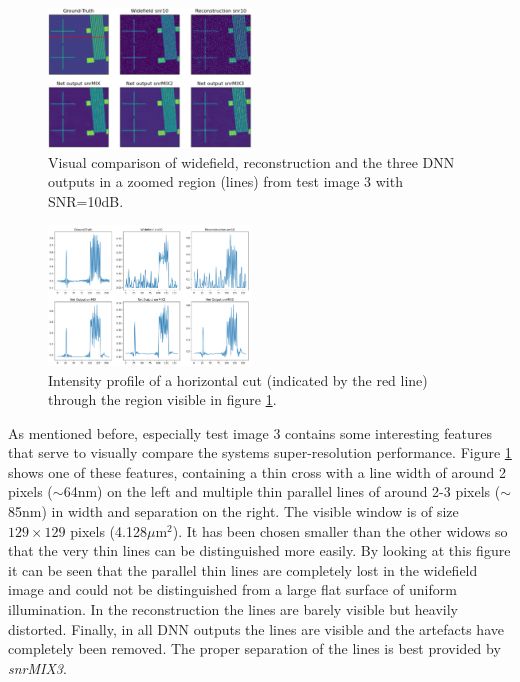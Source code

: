 \documentclass[conference]{IEEEtran}
\begin{document}
\begin{figure}[h!]
    \centering
    \includegraphics[width=0.48\textwidth]{images/test_img_3_model_comp_snr10_cross_line.png}
    \caption{Visual comparison of widefield, reconstruction and the three DNN outputs in a zoomed region (lines) from test image 3 with SNR=10dB.}
    \label{fig:test_img_3_model_comp_snr10_cross}
\end{figure}
\begin{figure}[h!]
    \centering
    \includegraphics[width=0.48\textwidth]{images/test_img_3_model_comp_snr10_cross_cut.png}
    \caption{Intensity profile of a horizontal cut (indicated by the red line) through the region visible in figure \ref{fig:test_img_3_model_comp_snr10_cross}.}
    \label{fig:test_img_3_model_comp_snr10_cross_cut}
\end{figure}

As mentioned before, especially test image 3 contains some interesting features that serve to visually compare the systems super-resolution performance. Figure \ref{fig:test_img_3_model_comp_snr10_cross} shows one of these features, containing a thin cross with a line width of around 2 pixels ($\sim$64nm) on the left and multiple thin parallel lines of around 2-3 pixels ($\sim$85nm) in width and separation on the right. The visible window is of size $129 \times 129$ pixels (4.128$\mu$m$^2$). It has been chosen smaller than the other widows so that the very thin lines can be distinguished more easily. By looking at this figure it can be seen that the parallel thin lines are completely lost in the widefield image and could not be distinguished from a large flat surface of uniform illumination. In the reconstruction the lines are barely visible but heavily distorted. Finally, in all DNN outputs the lines are visible and the artefacts have completely been removed. The proper separation of the lines is best provided by \textit{snrMIX3}.
\end{document}
